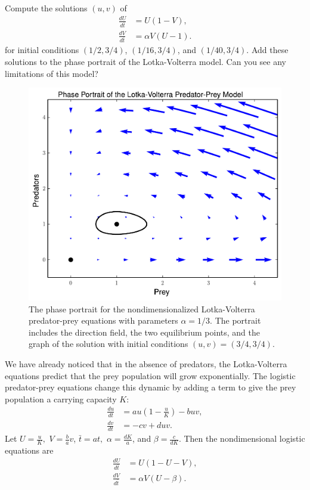\begin{problem}
Compute the solutions $(u,v)$ of 
\begin{align*}
	\frac{dU}{d\bar{t}} &= U(1-V),\\
	\frac{dV}{d\bar{t}} &= \alpha V (U-1).
\end{align*}
for initial conditions $(1/2, 3/4)$, $(1/16, 3/4)$, and $(1/40, 3/4)$.
Add these solutions to the phase portrait of the Lotka-Volterra model.
Can you see any limitations of this model? 
\end{problem}

\begin{figure}
\centering
\includegraphics[width=\textwidth]{Lotka_Volterra_Phase_Portrait.pdf}
\caption{The phase portrait for the nondimensionalized Lotka-Volterra predator-prey equations with parameters $\alpha = 1/3$. 
The portrait includes the direction field, the two equilibrium points, and the graph of the solution with initial conditions $(u,v) = (3/4, 3/4)$. }
\label{fig:pred-prey_Lotka_Voterra_Phase_Portrait}
\end{figure}

We have already noticed that in the absence of predators, the Lotka-Volterra equations predict that the prey population will grow exponentially.
The logistic predator-prey equations change this dynamic by adding a term to give the prey population a carrying capacity $K$: 
\begin{align*}
	\frac{du}{dt} &= au\left(1 -\frac{u}{K}\right) - buv,\\
	\frac{dv}{dt} &= -cv + duv.
\end{align*}
Let $U = \frac{u}{K},$ $V = \frac{b}{a}v$, $\bar{t} = at,$  $\alpha = \frac{dK}{a}$, and $\beta = \frac{c}{dK}$.
Then the nondimensional logistic equations are 
\begin{align*}
	\frac{dU}{d\bar{t}} &= U(1-U-V),\\
	\frac{dV}{d\bar{t}} &= \alpha V (U-\beta).
\end{align*}

